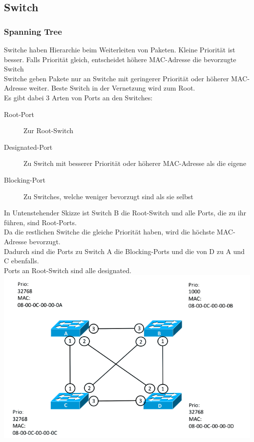 \documentclass[12pt,a4paper]{article}
\begin{document}
		\subsection{Switch}
			\subsubsection{Spanning Tree}
				Switche haben Hierarchie beim Weiterleiten von Paketen. Kleine Priorität ist besser. Falls Priorität gleich, entscheidet höhere MAC-Adresse die bevorzugte Switch\\
				Switche geben Pakete nur an Switche mit geringerer Priorität oder höherer MAC-Adresse weiter. Beste Switch in der Vernetzung wird zum Root.\\
				Es gibt dabei 3 Arten von Ports an den Switches:
				\begin{description}
					\item[Root-Port] Zur Root-Switch
					\item[Designated-Port] Zu Switch mit besserer Priorität oder höherer MAC-Adresse als die eigene
					\item[Blocking-Port] Zu Switches, welche weniger bevorzugt sind als sie selbst 
				\end{description}
				In Untenstehender Skizze ist Switch B die Root-Switch und alle Ports, die zu ihr führen, sind Root-Ports.\\
				Da die restlichen Switche die gleiche Priorität haben, wird die höchste MAC-Adresse bevorzugt. \\
				Dadurch sind die Ports zu Switch A die Blocking-Ports und die von D zu A und C ebenfalls. \\
				Ports an Root-Switch sind alle designated.\\
				\includegraphics[scale=0.5]{Bilder/RouterVermascht.png}
\end{document}

